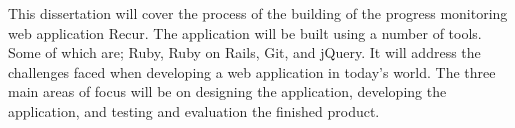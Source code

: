 This dissertation will cover the process of the building of the progress monitoring web application Recur. The application will be built using a number of tools. Some of which are; Ruby, Ruby on Rails, Git, and jQuery. It will address the challenges faced when developing a web application in today's world. The three main areas of focus will be on designing the application, developing the application, and testing and evaluation the finished product.\\